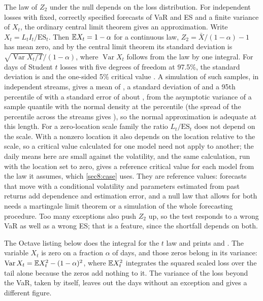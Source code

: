 \begin{chapterrefs}
The law of $Z_2$ under the null depends on the loss distribution. For independent losses with fixed,
correctly specified forecasts of VaR and ES and a finite variance of $X_t$, the ordinary central limit
theorem gives an approximation. Write $X_t=L_tI_t/\mathrm{ES}_t$. Then $\mathbb{E} X_t=1-\alpha$ for a continuous
law, $Z_2=\bar X/(1-\alpha)-1$ has mean zero, and by the central limit theorem its standard deviation is
$\sqrt{\operatorname{Var}X_t/T}/(1-\alpha)$, where $\operatorname{Var}X_t$ follows from the law by one
integral. For \ztT{} days of Student $t$ losses with five degrees of freedom at 97.5\%, the standard
deviation is \ztSdAn{} and the one-sided 5\% critical value \ztCritAn. A simulation of \ztM{} such
samples, in \ztStreams{} independent streams, gives a mean of \ztMean, a standard deviation of \ztSd{}
and a 95th percentile of \ztCrit{} with a standard error of about \ztCritSeAn, from the asymptotic
variance of a sample quantile with the normal density at the percentile (the spread of the
percentile across the streams gives \ztCritSe), so the normal approximation is
adequate at this length. For a zero-location scale family the ratio $L_t/\mathrm{ES}_t$ does not depend on
the scale. With a nonzero location it also depends on the location relative to the scale, so a
critical value calculated for one model need not apply to another; the daily means here are small
against the volatility, and the same calculation, run with the location set to zero, gives a
reference critical value for each model from the law it assumes, which \cref{sec8:case} uses. They are
reference values: forecasts that move with a conditional volatility and parameters estimated from past
returns add dependence and estimation error, and a null law that allows for both needs a martingale
limit theorem or a simulation of the whole forecasting procedure. Too many exceptions also push
$Z_2$ up, so the test responds to a wrong VaR as well as a wrong ES; that is a feature, since the
shortfall depends on both.

The Octave listing below does the integral for the $t$ law and prints \ztSdAn{} and \ztCritAn. The
variable $X_t$ is zero on a fraction $\alpha$ of days, and those zeros belong in its variance:
$\operatorname{Var}X_t=\mathbb{E} X_t^2-(1-\alpha)^2$, where $\mathbb{E} X_t^2$ integrates the squared scaled loss
over the tail alone because the zeros add nothing to it. The variance of the loss beyond the VaR,
taken by itself, leaves out the days without an exception and gives a different figure.



\end{chapterrefs}
